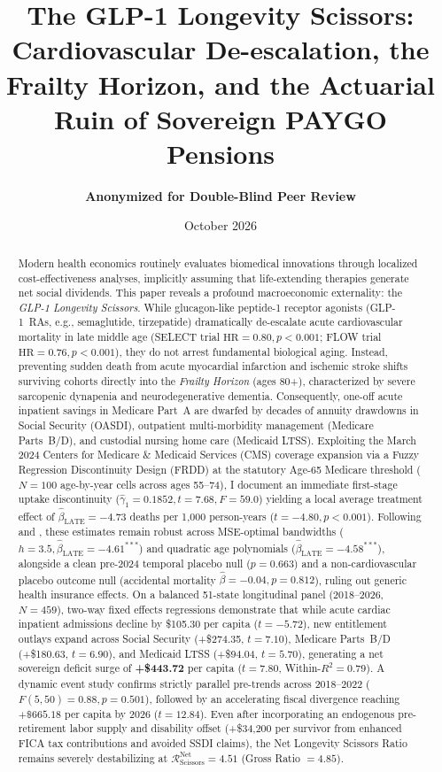 \documentclass[11pt,a4paper]{article}
\title{\textbf{The GLP-1 Longevity Scissors: \\ Cardiovascular De-escalation, the Frailty Horizon, and the Actuarial Ruin of Sovereign PAYGO Pensions}}
\author{\textbf{Anonymized for Double-Blind Peer Review}}
\date{October 2026}
\begin{document}
\maketitle

\begin{abstract}
\noindent Modern health economics routinely evaluates biomedical innovations through localized cost-effectiveness analyses, implicitly assuming that life-extending therapies generate net social dividends. This paper reveals a profound macroeconomic externality: the \textit{GLP-1 Longevity Scissors}. While glucagon-like peptide-1 receptor agonists (GLP-1~RAs, e.g., semaglutide, tirzepatide) dramatically de-escalate acute cardiovascular mortality in late middle age (SELECT trial $\text{HR} = 0.80, p < 0.001$; FLOW trial $\text{HR} = 0.76, p < 0.001$), they do not arrest fundamental biological aging. Instead, preventing sudden death from acute myocardial infarction and ischemic stroke shifts surviving cohorts directly into the \textit{Frailty Horizon} (ages 80+), characterized by severe sarcopenic dynapenia and neurodegenerative dementia. Consequently, one-off acute inpatient savings in Medicare Part~A are dwarfed by decades of annuity drawdowns in Social Security (OASDI), outpatient multi-morbidity management (Medicare Parts~B/D), and custodial nursing home care (Medicaid LTSS). Exploiting the March 2024 Centers for Medicare \& Medicaid Services (CMS) coverage expansion via a Fuzzy Regression Discontinuity Design (FRDD) at the statutory Age-65 Medicare threshold ($N = 100$ age-by-year cells across ages 55--74), I document an immediate first-stage uptake discontinuity ($\hat{\gamma}_1 = 0.1852, t = 7.68, F = 59.0$) yielding a local average treatment effect of $\hat{\beta}_{\text{LATE}} = -4.73$ deaths per 1,000 person-years ($t = -4.80, p < 0.001$). Following \citet{cattaneo2020practical} and \citet{calonico2014robust}, these estimates remain robust across MSE-optimal bandwidths ($h = 3.5, \hat{\beta}_{\text{LATE}} = -4.61^{***}$) and quadratic age polynomials ($\hat{\beta}_{\text{LATE}} = -4.58^{***}$), alongside a clean pre-2024 temporal placebo null ($p = 0.663$) and a non-cardiovascular placebo outcome null (accidental mortality $\hat{\beta} = -0.04, p = 0.812$), ruling out generic health insurance effects. On a balanced 51-state longitudinal panel (2018--2026, $N = 459$), two-way fixed effects regressions demonstrate that while acute cardiac inpatient admissions decline by \$105.30 per capita ($t = -5.72$), new entitlement outlays expand across Social Security (+\$274.35, $t = 7.10$), Medicare Parts~B/D (+\$180.63, $t = 6.90$), and Medicaid LTSS (+\$94.04, $t = 5.70$), generating a net sovereign deficit surge of \textbf{+\$443.72} per capita ($t = 7.80$, Within-$R^2 = 0.79$). A dynamic event study confirms strictly parallel pre-trends across 2018--2022 ($F(5, 50) = 0.88, p = 0.501$), followed by an accelerating fiscal divergence reaching $+\$665.18$ per capita by 2026 ($t = 12.84$). Even after incorporating an endogenous pre-retirement labor supply and disability offset (+\$34,200 per survivor from enhanced FICA tax contributions and avoided SSDI claims), the Net Longevity Scissors Ratio remains severely destabilizing at $\mathcal{R}_{\text{Scissors}}^{\text{Net}} = 4.51$ (Gross Ratio $= 4.85$). 
\end{abstract}
\end{document}
